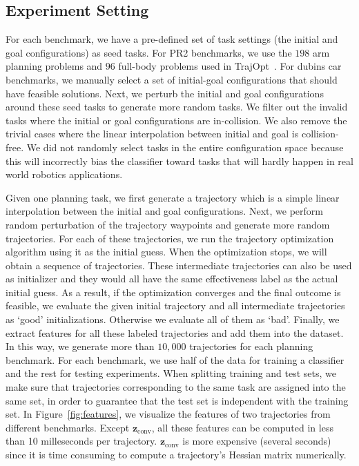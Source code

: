 \documentclass[letterpaper, 10 pt, conference]{ieeeconf}  %
\newcommand{\fconv}{\mbox{$\mathbf z_{\text{conv}}$}}
\begin{document}
\subsection{Experiment Setting}
For each benchmark, we have a pre-defined set of task settings (the initial and goal configurations) as seed tasks. For PR2 benchmarks, we use the $198$ arm planning problems and $96$ full-body problems used in TrajOpt~\cite{Schulman:2013:FLO}. For dubins car benchmarks, we manually select a set of initial-goal configurations that should have feasible solutions. Next, we perturb the initial and goal configurations around these seed tasks to generate more random tasks. We filter out the invalid tasks where the initial or goal configurations are in-collision. We also remove the trivial cases where the linear interpolation between initial and goal is collision-free. We did not randomly select tasks in the entire configuration space because this will incorrectly bias the classifier toward tasks that will hardly happen in real world robotics applications.

Given one planning task, we first generate a trajectory which is a simple linear interpolation between the initial and goal configurations. Next, we perform random perturbation of the trajectory waypoints and generate more random trajectories. For each of these trajectories, we run the trajectory optimization algorithm using it as the initial guess. When the optimization stops, we will obtain a sequence of trajectories. These intermediate trajectories can also be used as initializer and they would all have the same effectiveness label as the actual initial guess. As a result, if the optimization converges and the final outcome is feasible, we evaluate the given initial trajectory and all intermediate trajectories as `good' initializations. Otherwise we evaluate all of them as `bad'. Finally, we extract features for all these labeled trajectories and add them into the dataset. In this way, we generate more than $10,000$ trajectories for each planning benchmark. For each benchmark, we use half of the data for training a classifier and the rest for testing experiments. When splitting training and test sets, we make sure that trajectories corresponding to the same task are assigned into the same set, in order to guarantee that the test set is independent with the training set. In Figure~\ref{fig:features}, we visualize the features of two trajectories from different benchmarks. Except $\fconv$, all these features can be computed in less than 10 milleseconds per trajectory. $\fconv$ is more expensive (several seconds) since it is time consuming to compute a trajectory's Hessian matrix numerically.
\end{document}
